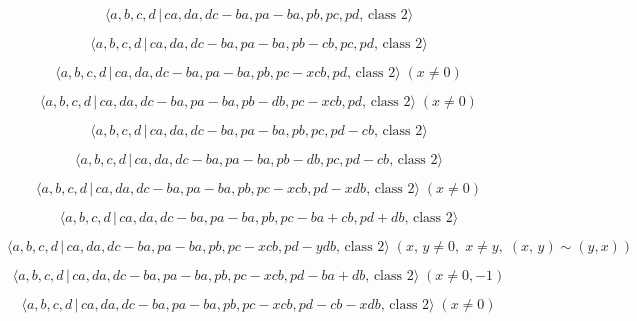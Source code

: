 \documentclass[10pt]{article}
\begin{document}
\begin{equation}
\langle a,b,c,d\,|\,ca,da,dc-ba,pa-ba,pb,pc,pd,\,\text{class }2\rangle 
\tag{7.3244}
\end{equation}

\begin{equation}
\langle a,b,c,d\,|\,ca,da,dc-ba,pa-ba,pb-cb,pc,pd,\,\text{class }2\rangle 
\tag{7.3245}
\end{equation}

\begin{equation}
\langle a,b,c,d\,|\,ca,da,dc-ba,pa-ba,pb,pc-xcb,pd,\,\text{class }2\rangle
\;(x \neq 0)  \tag{7.3246}
\end{equation}

\begin{equation}
\langle a,b,c,d\,|\,ca,da,dc-ba,pa-ba,pb-db,pc-xcb,pd,\,\text{class }%
2\rangle \;(x \neq 0)  \tag{7.3247}
\end{equation}

\begin{equation}
\langle a,b,c,d\,|\,ca,da,dc-ba,pa-ba,pb,pc,pd-cb,\,\text{class }2\rangle 
\tag{7.3248}
\end{equation}

\begin{equation}
\langle a,b,c,d\,|\,ca,da,dc-ba,pa-ba,pb-db,pc,pd-cb,\,\text{class }2\rangle
\tag{7.3249}
\end{equation}

\begin{equation}
\langle a,b,c,d\,|\,ca,da,dc-ba,pa-ba,pb,pc-xcb,pd-xdb,\,\text{class }%
2\rangle \;(x \neq 0)  \tag{7.3250}
\end{equation}

\begin{equation}
\langle a,b,c,d\,|\,ca,da,dc-ba,pa-ba,pb,pc-ba+cb,pd+db,\,\text{class }%
2\rangle  \tag{7.3251}
\end{equation}

\begin{equation}
\langle a,b,c,d\,|\,ca,da,dc-ba,pa-ba,pb,pc-xcb,pd-ydb,\,\text{class }%
2\rangle \;(x,\,y\neq 0,\;x\neq y,\;(x,\,y)\sim (y,x))  \tag{7.3252}
\end{equation}

\begin{equation}
\langle a,b,c,d\,|\,ca,da,dc-ba,pa-ba,pb,pc-xcb,pd-ba+db,\,\text{class }%
2\rangle \;(x \neq 0,-1)  \tag{7.3253}
\end{equation}

\begin{equation}
\langle a,b,c,d\,|\,ca,da,dc-ba,pa-ba,pb,pc-xcb,pd-cb-xdb,\,\text{class }%
2\rangle \;(x \neq 0)  \tag{7.3254}
\end{equation}
\end{document}
